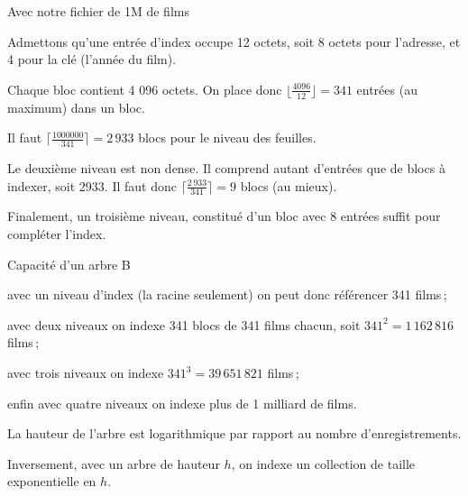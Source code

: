 \begin{frame}{Avec notre fichier de 1M de films}

Admettons qu'une 
entrée d'index occupe 12 octets, soit 8 octets pour l'adresse, et 4 pour la clé (l'année du film).
    
    \vfill
    
    Chaque bloc contient 4 096 octets. On place donc $\lfloor \frac{4096}{12} \rfloor = 341$ entrées
    (au maximum) dans un bloc.
   
   
\begin{blocgauche}
\begin{redbullet}
    
    \item  Il faut $\lceil \frac{1000000}{341} \rceil=2\,933$ blocs 
    pour le  niveau des feuilles. 
   
   \item  Le deuxième niveau est \alert{non dense}. Il comprend autant d'entrées que de blocs
    à indexer, soit 2933.  Il faut
    donc $\lceil \frac{2\,933}{341} \rceil = 9$ blocs (au mieux).
    
    \item Finalement, un troisième niveau, constitué d'un bloc
     avec 8 entrées suffit pour compléter l'index.
\end{redbullet}
\end{blocgauche}

\end{frame}

\begin{frame}{Capacité d'un arbre B}


\begin{redbullet}
   \item  avec un niveau d'index (la racine seulement)
             on peut donc référencer 341 films\,;

   \item  avec deux niveaux on indexe 341
          blocs de 341 films chacun, soit $341^2 = 1\,162\,816 $ films\,;

   \item  avec trois niveaux on indexe $341^3 = 39\,651\,821$ films\,;

  \item enfin avec quatre niveaux on indexe plus de 1 milliard de films.
\end{redbullet}
\vfill

\begin{blocgauche}
\begin{redbullet}
  \item La hauteur de l'arbre est \alert{logarithmique} par rapport au nombre d'enregistrements.
  \item Inversement, avec un arbre de hauteur $h$, on indexe un collection de taille
      \alert{exponentielle} en $h$.
\end{redbullet}
\end{blocgauche}
\end{frame}


